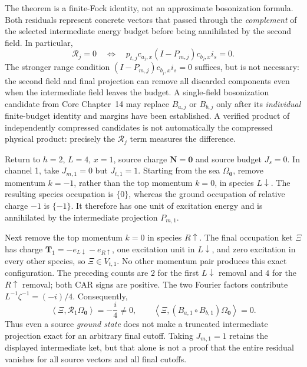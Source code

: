 The theorem is a finite-Fock identity, not an approximate bosonization
formula.  Both residuals represent concrete vectors that passed through
the \emph{complement} of the selected intermediate energy budget before
being annihilated by the second field.  In particular,
\begin{equation}
 \mathcal R_j=0
 \quad\Longleftrightarrow\quad
 p_{t,j}c_{a_j,x}(I-P_{m,j})c_{b_j,x}i_s=0.
 \label{eq:ch21-pair-residual-criterion}
\end{equation}
The stronger range condition
\((I-P_{m,j})c_{b_j,x}i_s=0\) suffices, but is not necessary:
the second field and final projection can remove all discarded
components even when the intermediate field leaves the budget.  A
single-field bosonization candidate from Core Chapter~14 may replace
\(B_{a,j}\) or \(B_{b,j}\) only after its \emph{individual}
finite-budget identity and margins have been established.  A verified product of independently
compressed candidates is not automatically the compressed physical
product: precisely the \(\mathcal R_j\) term measures the difference.

\begin{example}
\label{ex:ch21-pair-residual}
Return to \(h=2\), \(L=4\), \(x=1\), source charge
\(\mathbf N=\mathbf0\) and source budget \(J_s=0\).  In channel 1,
take \(J_{m,1}=0\) but \(J_{t,1}=1\).  Starting from the sea
\(\Omega_{\mathbf0}\), remove momentum \(k=-1\), rather than the
top momentum \(k=0\), in species \(L\downarrow\).  The resulting
species occupation is \(\{0\}\), whereas the ground occupation of
relative charge \(-1\) is \(\{-1\}\).  It therefore has one unit
of excitation energy and is annihilated by the intermediate projection
\(P_{m,1}\).

Next remove the top momentum \(k=0\) in species \(R\uparrow\).
The final occupation ket \(\Xi\) has charge
\(\mathbf T_1=-e_{L\downarrow}-e_{R\uparrow}\), one excitation
unit in \(L\downarrow\), and zero excitation in every other
species, so \(\Xi\in V_{t,1}\).  No other momentum pair
produces this exact configuration.  The preceding counts are \(2\)
for the first \(L\downarrow\) removal and \(4\) for the
\(R\uparrow\) removal; both CAR signs are positive.  The two
Fourier factors contribute
\(L^{-1}\zeta^{-1}=(-i)/4\).  Consequently,
\begin{equation}
 \left\langle\Xi,\mathcal R_1\Omega_{\mathbf0}\right\rangle
     =-\frac{i}{4}\ne0,\qquad
 \left\langle\Xi,(B_{a,1}\circ B_{b,1})
          \Omega_{\mathbf0}\right\rangle=0.
 \label{eq:ch21-pair-residual-witness}
\end{equation}
Thus even a source \emph{ground state} does not make a truncated
intermediate projection exact for an arbitrary final cutoff.  Taking
\(J_{m,1}=1\) retains the displayed intermediate ket, but that alone
is not a proof that the entire residual vanishes for all source
vectors and all final cutoffs.
\end{example}

